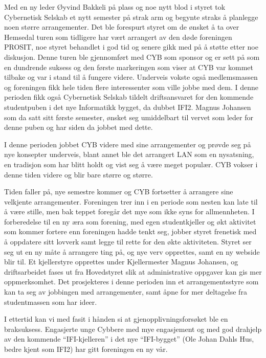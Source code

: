 \documentclass[../main.tex]{subfiles}
\begin{document}
Med en ny leder Øyvind Bakkeli på plass og noe nytt blod i styret tok Cybernetisk Selskab et nytt semester på strak arm og begynte straks å planlegge noen større arrangementer. Det ble forespurt styret om de ønsket å ta over Hemsedal turen som tidligere har vært arrangert av den døde foreningen PROSIT, noe styret behandlet i god tid og senere gikk med på å støtte etter noe diskusjon. Denne turen ble gjennomført med CYB som sponsor og er sett på som en dundrende suksess og den første markeringen som viser at CYB var kommet tilbake og var i stand til å fungere videre. Underveis vokste også medlemsmassen og foreningen fikk hele tiden flere interessenter som ville jobbe med dem. I denne perioden fikk også Cybernetisk Selskab tildelt driftsansvaret for den kommende studentpuben i det nye Informatikk bygget, da dubbet IFI2. Magnus Johansen som da satt sitt første semester, ønsket seg umiddelbart til vervet som leder for denne puben og har siden da jobbet med dette.

I denne perioden jobbet CYB videre med sine arrangementer og prøvde seg på nye konsepter underveis, blant annet ble det arrangert LAN som en nysatsning, en tradisjon som har blitt holdt og vist seg å være meget populær. CYB vokser i denne tiden videre og blir bare større og større.

Tiden faller på, nye semestre kommer og CYB fortsetter å arrangere sine velkjente arrangementer. Foreningen trer inn i en periode som nesten kan late til å være stille, men bak teppet foregår det mye som ikke syns for allmennheten. I forberedelse til en ny æra som forening, med egen studentkjeller og økt aktivitet som kommer fortere enn foreningen hadde tenkt seg, jobber styret frenetisk med å oppdatere sitt lovverk samt legge til rette for den økte aktiviteten. Styret ser seg ut en ny måte å arrangere ting på, og nye verv opprettes, samt en ny webside blir til. Et kjellerstyre opprettes under Kjellermester Magnus Johansen, og driftsarbeidet fases ut fra Hovedstyret slik at administrative oppgaver kan gis mer oppmerksomhet. Det prosjekteres i denne perioden inn et arrangementsstyre som kan ta seg av jobbingen med arrangementer, samt åpne for mer deltagelse fra studentmassen som har ideer.

I ettertid kan vi med fasit i hånden si at gjenopplivningsforsøket ble en braksuksess. Engasjerte unge Cybbere med mye engasjement og med god drahjelp av den kommende “IFI-kjelleren” i det nye “IFI-bygget” (Ole Johan Dahls Hus, bedre kjent som IFI2) har gitt foreningen en ny vår.
\end{document}
